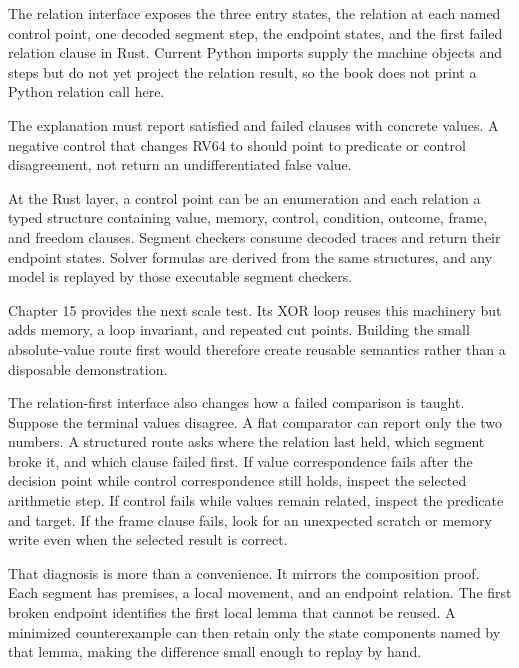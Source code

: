 \begin{keyidea}[title={Contract for a relation-first interface}]
The relation interface exposes the three entry states, the relation at
each named control point, one decoded segment step, the endpoint states, and
the first failed relation clause in Rust. Current Python imports supply the
machine objects and steps but do not yet project the relation result, so the
book does not print a Python relation call here.
\end{keyidea}

The explanation must report satisfied and failed clauses with concrete values.
A negative control that changes RV64  to  should point to
predicate or control disagreement, not return an undifferentiated false value.

At the Rust layer, a control point can be an enumeration and each relation a
typed structure containing value, memory, control, condition, outcome, frame,
and freedom clauses. Segment checkers consume decoded traces and return their
endpoint states. Solver formulas are derived from the same structures, and any
model is replayed by those executable segment checkers.

Chapter 15 provides the next scale test. Its XOR loop reuses this machinery but
adds memory, a loop invariant, and repeated cut points. Building the small
absolute-value route first would therefore create reusable semantics rather
than a disposable demonstration.

The relation-first interface also changes how a failed comparison is taught.
Suppose the terminal values disagree. A flat comparator can report only the
two numbers. A structured route asks where the relation last held, which
segment broke it, and which clause failed first. If value correspondence fails
after the decision point while control correspondence still holds, inspect
the selected arithmetic step. If control fails while values remain related,
inspect the predicate and target. If the frame clause fails, look for an
unexpected scratch or memory write even when the selected result is correct.

That diagnosis is more than a convenience. It mirrors the composition proof.
Each segment has premises, a local movement, and an endpoint relation. The
first broken endpoint identifies the first local lemma that cannot be reused.
A minimized counterexample can then retain only the state components named by
that lemma, making the difference small enough to replay by hand.

